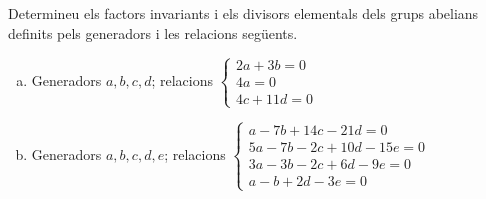 \documentclass[../main.tex]{subfiles}
\begin{document}
\begin{ej}
[Exercici] Determineu els factors invariants i els divisors elementals dels grups abelians definits pels generadors i les relacions següents.
\begin{enumerate}[(a)]
    \item Generadors $a,b,c,d$; relacions $\left\{
    \begin{array}{ll}
        2a+3b= 0 \\
        4a = 0 \\
        4c+11d = 0
    \end{array}
    \right.$
    
    \item Generadors $a,b,c,d,e$; relacions $\left\{
    \begin{array}{ll}
        a-7b+14c-21d = 0 \\
        5a-7b-2c+10d-15e = 0 \\
        3a-3b-2c+6d-9e = 0 \\
        a-b+2d-3e = 0
    \end{array}
    \right.$
\end{enumerate}
\end{ej}
\end{document}
